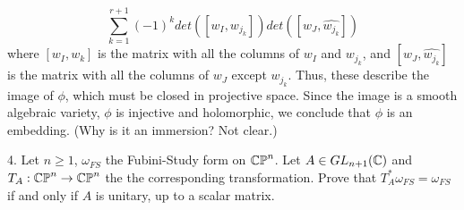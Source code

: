 \documentclass[12pt]{article}
\begin{document}
\begin{solution}
\begin{enumerate}
        \[ \sum_{k =1}^{r+1} (-1)^k det([w_I, w_{j_k}])det([w_J, \hat{w_{j_k}}])\]
        where $[w_I, w_k]$ is the matrix with all the columns of $w_I$ and $w_{j_k}$, and $[w_J, \hat{w_{j_k}}]$ is the matrix with all the columns of $w_J$ except $w_{j_k}$. Thus, these describe the image of $\phi$, which must be closed in projective space. \bbni
        Since the image is a smooth algebraic variety, $\phi$ is injective and holomorphic, we conclude that $\phi$ is an embedding. 
        (Why is it an immersion? Not clear.)
    \end{enumerate}
\end{solution}
\newpage

\begin{problem}{4.}
    Let $n \geq 1$, $\omega_{FS}$ the Fubini-Study form on $\mathbb{CP}^n$. Let $A \in GL_{n+1}(\mathbb C)$ and $T_A: \mathbb{CP}^n \to \mathbb{CP}^n$ the the corresponding transformation. Prove that $T_A^* \omega_{FS} = \omega_{FS}$ if and only if $A$ is unitary, up to a scalar matrix.
\end{problem}
\end{document}
